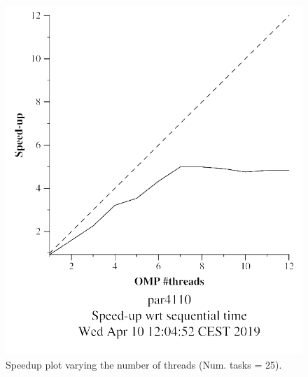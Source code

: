 \documentclass[12pt, a4paper]{article}
\begin{document}
\begin{figure}[H]
\begin{minipage}[b]{0.4\linewidth}
  \includegraphics[scale=0.5]{./mandel-omp-10000-strong-omp-3-25-speedup}
  \caption{Speedup plot varying the number of threads (Num. tasks = 25).}
  \label{fig:mandel-omp-10000-strong-omp-3-25-speedup}
\end{minipage}
\end{figure}
\end{document}
